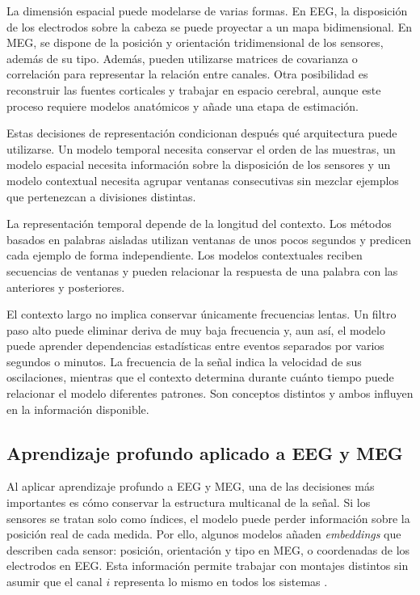 La dimensión espacial puede modelarse de varias formas. En EEG, la disposición de los electrodos sobre la cabeza se puede proyectar a un mapa bidimensional. En MEG, se dispone de la posición y orientación tridimensional de los sensores, además de su tipo. Además, pueden utilizarse matrices de covarianza o correlación para representar la relación entre canales. Otra posibilidad es reconstruir las fuentes corticales y trabajar en espacio cerebral, aunque este proceso requiere modelos anatómicos y añade una etapa de estimación.

Estas decisiones de representación condicionan después qué arquitectura puede utilizarse. Un modelo temporal necesita conservar el orden de las muestras, un modelo espacial necesita información sobre la disposición de los sensores y un modelo contextual necesita agrupar ventanas consecutivas sin mezclar ejemplos que pertenezcan a divisiones distintas.

La representación temporal depende de la longitud del contexto. Los métodos basados en palabras aisladas utilizan ventanas de unos pocos segundos y predicen cada ejemplo de forma independiente. Los modelos contextuales reciben secuencias de ventanas y pueden relacionar la respuesta de una palabra con las anteriores y posteriores.

El contexto largo no implica conservar únicamente frecuencias lentas. Un filtro paso alto puede eliminar deriva de muy baja frecuencia y, aun así, el modelo puede aprender dependencias estadísticas entre eventos separados por varios segundos o minutos. La frecuencia de la señal indica la velocidad de sus oscilaciones, mientras que el contexto determina durante cuánto tiempo puede relacionar el modelo diferentes patrones. Son conceptos distintos y ambos influyen en la información disponible.

\subsection{Aprendizaje profundo aplicado a EEG y MEG}

Al aplicar aprendizaje profundo a EEG y MEG, una de las decisiones más importantes es cómo conservar la estructura multicanal de la señal. Si los sensores se tratan solo como índices, el modelo puede perder información sobre la posición real de cada medida. Por ello, algunos modelos añaden \textit{embeddings} que describen cada sensor: posición, orientación y tipo en MEG, o coordenadas de los electrodos en EEG. Esta información permite trabajar con montajes distintos sin asumir que el canal \(i\) representa lo mismo en todos los sistemas \cite{dascoli2025words,xiao2025brainomni,jayalath2026megxl}.

